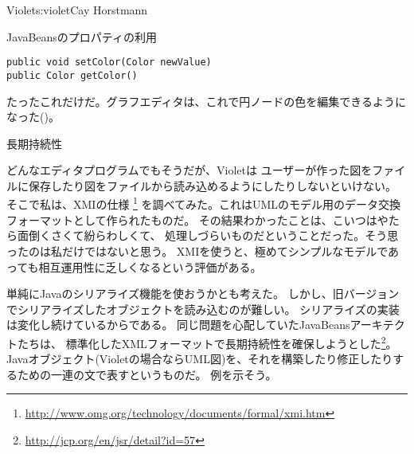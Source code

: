 \begin{aosachapter}{Violet}{s:violet}{Cay Horstmann}
\begin{aosasect1}{JavaBeansのプロパティの利用}
\begin{verbatim}
public void setColor(Color newValue)
public Color getColor()
\end{verbatim}

\noindent
たったこれだけだ。グラフエディタは、これで円ノードの色を編集できるようになった()。


\end{aosasect1}

\begin{aosasect1}{長期持続性}

どんなエディタプログラムでもそうだが、Violetは
ユーザーが作った図をファイルに保存したり図をファイルから読み込めるようにしたりしないといけない。
そこで私は、XMIの仕様
\footnote{\url{http://www.omg.org/technology/documents/formal/xmi.htm}}
を調べてみた。これはUMLのモデル用のデータ交換フォーマットとして作られたものだ。
その結果わかったことは、こいつはやたら面倒くさくて紛らわしくて、
処理しづらいものだということだった。そう思ったのは私だけではないと思う。
XMIを使うと、極めてシンプルなモデルであっても相互運用性に乏しくなるという評価がある\cite{bib:persson:osstools}。

単純にJavaのシリアライズ機能を使おうかとも考えた。
しかし、旧バージョンでシリアライズしたオブジェクトを読み込むのが難しい。
シリアライズの実装は変化し続けているからである。
同じ問題を心配していたJavaBeansアーキテクトたちは、
標準化したXMLフォーマットで長期持続性を確保しようとした\footnote{\url{http://jcp.org/en/jsr/detail?id=57}}。
Javaオブジェクト(Violetの場合ならUML図)を、それを構築したり修正したりするための一連の文で表すというものだ。
例を示そう。


\end{aosasect1}
\end{aosachapter}
